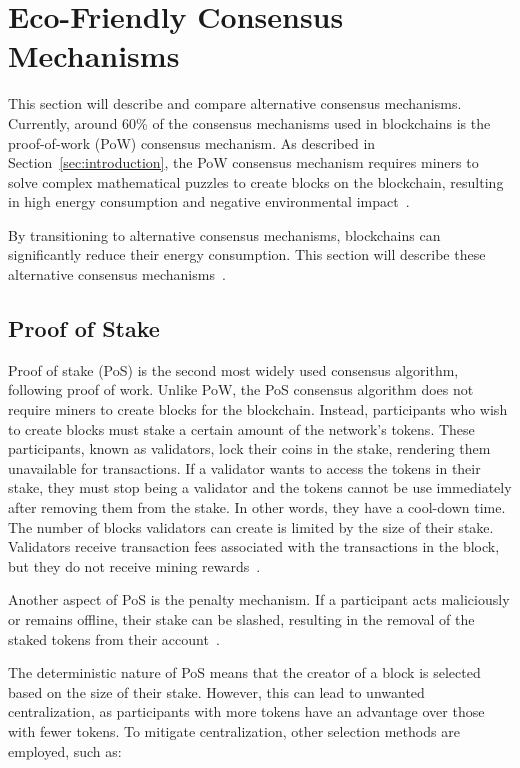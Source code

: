 

\section{Eco-Friendly Consensus Mechanisms}\label{sec:eco-friendly-consensus-mechanisms}
This section will describe and compare alternative consensus mechanisms.
Currently, around 60\% of the consensus mechanisms used in blockchains is the proof-of-work (PoW) consensus mechanism.
As described in Section~\ref{sec:introduction}, the PoW consensus mechanism requires miners to solve complex mathematical puzzles to create blocks on the blockchain, resulting in high energy consumption and negative environmental impact~\cite{overview-of-sustainablity-blockchains, moralis-pow-enery-consumption}.

By transitioning to alternative consensus mechanisms, blockchains can significantly reduce their energy consumption.
This section will describe these alternative consensus mechanisms~\cite{4-ways-to-counter-blockchains-energy-consumption}.

\subsection{Proof of Stake}\label{subsec:proof-of-stake}
Proof of stake (PoS) is the second most widely used consensus algorithm, following proof of work.
Unlike PoW, the PoS consensus algorithm does not require miners to create blocks for the blockchain.
Instead, participants who wish to create blocks must stake a certain amount of the network's tokens.
These participants, known as validators, lock their coins in the stake, rendering them unavailable for transactions.
If a validator wants to access the tokens in their stake, they must stop being a validator and the tokens cannot be use immediately after removing them from the stake.
In other words, they have a cool-down time.
The number of blocks validators can create is limited by the size of their stake.
Validators receive transaction fees associated with the transactions in the block, but they do not receive mining rewards~\cite{bitpanda-pos}.

Another aspect of PoS is the penalty mechanism.
If a participant acts maliciously or remains offline, their stake can be slashed, resulting in the removal of the staked tokens from their account~\cite{bitpanda-pos}.

The deterministic nature of PoS means that the creator of a block is selected based on the size of their stake.
However, this can lead to unwanted centralization, as participants with more tokens have an advantage over those with fewer tokens.
To mitigate centralization, other selection methods are employed, such as:

